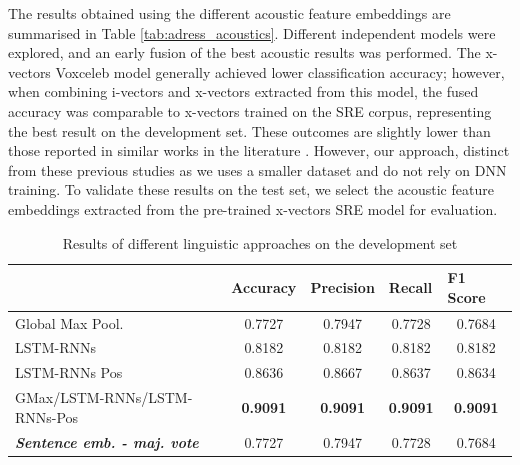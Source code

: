 The results obtained using the different acoustic feature embeddings are summarised in Table \ref{tab:adress_acoustics}. Different independent models were explored, and an early fusion of the best acoustic results was performed. The x-vectors Voxceleb model generally achieved lower classification accuracy; however, when combining i-vectors and x-vectors extracted from this model, the fused accuracy was comparable to x-vectors trained on the SRE corpus, representing the best result on the development set. These outcomes are slightly lower than those reported in similar works in the literature \cite{warnita18_interspeech,zargarbashi2019multi}. However, our approach, distinct from these previous studies as we uses a smaller dataset and do not rely on \ac{DNN} training. To validate these results on the test set, we select the acoustic feature embeddings extracted from the pre-trained x-vectors SRE model for evaluation.
\begin{table}[t]
  \begin{tabular}{lcccc}
  \hline
& \multicolumn{1}{l}{\textbf{Accuracy}} & \multicolumn{1}{l}{\textbf{Precision}} & \multicolumn{1}{l}{\textbf{Recall}} & \multicolumn{1}{l}{\textbf{F1 Score}} \\ \hline
  Global Max Pool. & 0.7727                               & 0.7947                                & 0.7728                             & 0.7684                               \\
  LSTM-RNNs        & 0.8182                               & 0.8182                                & 0.8182                             & 0.8182                               \\
  LSTM-RNNs Pos    & 0.8636                               & 0.8667                                & 0.8637                             & 0.8634                               \\
  GMax/LSTM-RNNs/LSTM-RNNs-Pos                   & \textbf{0.9091}                               & \textbf{0.9091}                                & \textbf{0.9091}                             & \textbf{0.9091}  \\  
  \textit{\textbf{Sentence emb. - maj. vote}}                    & 0.7727                               &0.7947                & 0.7728                           & 0.7684
  \\ \hline
  \end{tabular}
  \caption{Results of different linguistic approaches on the development set}
  \label{tab:res_dev_ling}
  \end{table}

